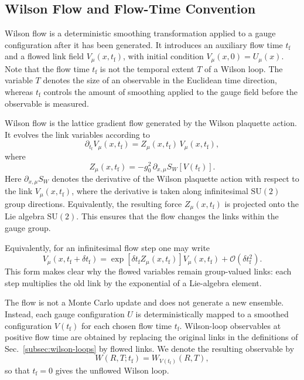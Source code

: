\documentclass[12pt,a4paper,oneside,numbers=noenddot]{scrreprt}
\newcommand{\SU}{\mathrm{SU}}
\newcommand{\order}{\mathcal{O}}
\begin{document}
\subsection{Wilson Flow and Flow-Time Convention}
\label{subsec:wilson-flow-convention}

Wilson flow is a deterministic smoothing transformation applied to a gauge
configuration after it has been generated. It introduces an auxiliary flow time
\(t_{\mathrm f}\) and a flowed link field \(V_\mu(x,t_{\mathrm f})\), with
initial condition $V_\mu(x,0)=U_\mu(x).$ 
Note that the flow time \(t_{\mathrm f}\) is not the temporal extent \(T\) of a Wilson
loop. The variable \(T\) denotes the size of an observable in the Euclidean time
direction, whereas \(t_{\mathrm f}\) controls the amount of smoothing applied to
the gauge field before the observable is measured.

Wilson flow is the lattice gradient flow generated by the Wilson plaquette
action. It evolves the link variables according to
\begin{equation}
  \partial_{t_{\mathrm f}} V_\mu(x,t_{\mathrm f})
  =
  Z_\mu(x,t_{\mathrm f})\,V_\mu(x,t_{\mathrm f}),
  \label{eq:lattice-flow-equation}
\end{equation}
where
\begin{equation}
  Z_\mu(x,t_{\mathrm f})
  =
  -g_0^2\,\partial_{x,\mu}S_W[V(t_{\mathrm f})].
  \label{eq:wilson-flow-force}
\end{equation}
Here \(\partial_{x,\mu}S_W\) denotes the derivative of the Wilson plaquette
action with respect to the link \(V_\mu(x,t_{\mathrm f})\), where the derivative
is taken along infinitesimal \(\SU(2)\) group directions. Equivalently, the
resulting force \(Z_\mu(x,t_{\mathrm f})\) is projected onto the Lie algebra
\(\SU(2)\). This ensures that the flow changes the links within the
gauge group.

Equivalently, for an infinitesimal flow step one may write
\begin{equation}
  V_\mu(x,t_{\mathrm f}+\delta t_{\mathrm f})
  =
  \exp\!\left[\delta t_{\mathrm f} Z_\mu(x,t_{\mathrm f})\right]
  V_\mu(x,t_{\mathrm f})
  +
  \order(\delta t_{\mathrm f}^2).
  \label{eq:infinitesimal-flow-step}
\end{equation}
This form makes clear why the flowed variables remain group-valued links: each
step multiplies the old link by the exponential of a Lie-algebra element.

The flow is not a Monte Carlo update and does not generate a new ensemble.
Instead, each gauge configuration \(U\) is deterministically mapped to a
smoothed configuration \(V(t_{\mathrm f})\) for each chosen flow time
\(t_{\mathrm f}\). Wilson-loop observables at positive flow time are obtained
by replacing the original links in the definitions of
Sec.~\ref{subsec:wilson-loops} by flowed links. We denote the resulting
observable by
\begin{equation}
  W(R,T;t_{\mathrm f})
  =
  W_{V(t_{\mathrm f})}(R,T),
  \label{eq:flowed-wilson-loop}
\end{equation}
so that \(t_{\mathrm f}=0\) gives the unflowed Wilson loop.
\end{document}
